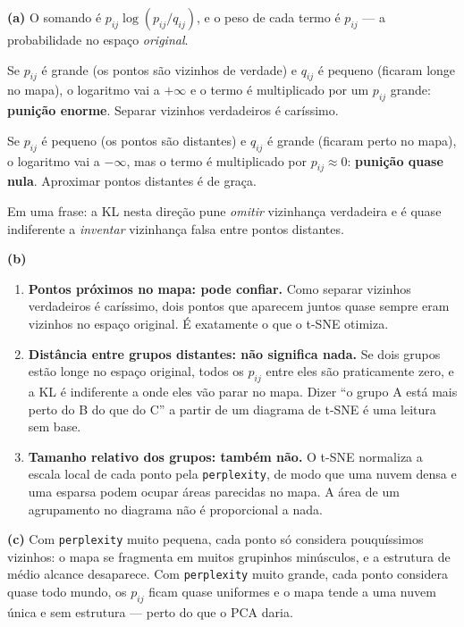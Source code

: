 \documentclass[11pt,a4paper]{article}
\begin{document}
\begin{solucao}
\textbf{(a)} O somando é $p_{ij}\log(p_{ij}/q_{ij})$, e o peso de cada termo é
$p_{ij}$ --- a probabilidade no espaço \emph{original}.

Se $p_{ij}$ é grande (os pontos são vizinhos de verdade) e $q_{ij}$ é pequeno
(ficaram longe no mapa), o logaritmo vai a $+\infty$ e o termo é multiplicado por
um $p_{ij}$ grande: \textbf{punição enorme}. Separar vizinhos verdadeiros é
caríssimo.

Se $p_{ij}$ é pequeno (os pontos são distantes) e $q_{ij}$ é grande (ficaram
perto no mapa), o logaritmo vai a $-\infty$, mas o termo é multiplicado por
$p_{ij} \approx 0$: \textbf{punição quase nula}. Aproximar pontos distantes é de
graça.

Em uma frase: a KL nesta direção pune \emph{omitir} vizinhança verdadeira e é
quase indiferente a \emph{inventar} vizinhança falsa entre pontos distantes.

\smallskip
\textbf{(b)}
\begin{enumerate}[label=(\roman*),leftmargin=1.1cm]
  \item \textbf{Pontos próximos no mapa: pode confiar.} Como separar vizinhos
        verdadeiros é caríssimo, dois pontos que aparecem juntos quase sempre
        eram vizinhos no espaço original. É exatamente o que o t-SNE otimiza.
  \item \textbf{Distância entre grupos distantes: não significa nada.} Se dois
        grupos estão longe no espaço original, todos os $p_{ij}$ entre eles são
        praticamente zero, e a KL é indiferente a onde eles vão parar no mapa.
        Dizer ``o grupo A está mais perto do B do que do C'' a partir de um
        diagrama de t-SNE é uma leitura sem base.
  \item \textbf{Tamanho relativo dos grupos: também não.} O t-SNE normaliza a
        escala local de cada ponto pela \texttt{perplexity}, de modo que uma
        nuvem densa e uma esparsa podem ocupar áreas parecidas no mapa. A área de
        um agrupamento no diagrama não é proporcional a nada.
\end{enumerate}

\smallskip
\textbf{(c)} Com \texttt{perplexity} muito pequena, cada ponto só considera
pouquíssimos vizinhos: o mapa se fragmenta em muitos grupinhos minúsculos, e a
estrutura de médio alcance desaparece. Com \texttt{perplexity} muito grande, cada
ponto considera quase todo mundo, os $p_{ij}$ ficam quase uniformes e o mapa
tende a uma nuvem única e sem estrutura --- perto do que o PCA daria.


\end{solucao}
\end{document}
